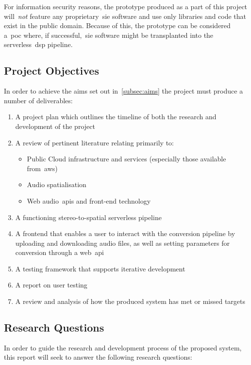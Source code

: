 For information security reasons, the prototype produced as a part of this project will~\textit{not} feature any proprietary~\gls{sie} software and use only libraries and code that exist in the public domain.
Because of this, the prototype can be considered a~\gls{poc} where, if successful,~\gls{sie} software might be transplanted into the serverless~\gls{dsp} pipeline.

\subsection{Project Objectives}\label{subsec:project-objectives}

In order to achieve the aims set out in~\ref{subsec:aims} the project must produce a number of deliverables:

\begin{enumerate}
    \item A project plan which outlines the timeline of both the research and development of the project
    \item A review of pertinent literature relating primarily to:
    \begin{itemize}
        \item Public Cloud infrastructure and services (especially those available from~\gls{aws})
        \item Audio spatialisation
        \item Web audio~\glspl{api} and front-end technology
    \end{itemize}
    \item A functioning stereo-to-spatial serverless pipeline
    \item A frontend that enables a user to interact with the conversion pipeline by uploading and downloading audio files, as well as setting parameters for conversion through a web~\gls{api}
    \item A testing framework that supports iterative development
    \item A report on user testing
    \item A review and analysis of how the produced system has met or missed targets
\end{enumerate}

\subsection{Research Questions}\label{subsec:research-questions}

In order to guide the research and development process of the proposed system, this report will seek to answer the following research questions:

